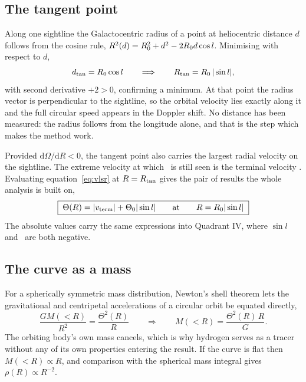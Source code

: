 \documentclass[11pt,a4paper]{article}
\begin{document}
\subsection{The tangent point}
\label{sec:tangent}

Along one sightline the Galactocentric radius of a point at heliocentric
distance $d$ follows from the cosine rule, $R^{2}(d) = R_{0}^{2} + d^{2} -
2R_{0} d\cos l$. Minimising with respect to $d$,
%
\begin{equation}
d_{\mathrm{tan}} = R_{0}\cos l
\qquad\Longrightarrow\qquad
R_{\mathrm{tan}} = R_{0}\,|\sin l| ,
\label{eq:rtan}
\end{equation}
%
with second derivative $+2 > 0$, confirming a minimum. At that point the
radius vector is perpendicular to the sightline, so the orbital velocity
lies exactly along it and the full circular speed appears in the Doppler
shift. No distance has been measured: the radius follows from the longitude
alone, and that is the step which makes the method work.

Provided $\mathrm{d}\Omega/\mathrm{d}R < 0$, the tangent point also carries
the largest radial velocity on the sightline. The extreme velocity at which
\HI\ is still seen is the terminal velocity \vterm. Evaluating
equation~\eqref{eq:vlsr} at $R = R_{\mathrm{tan}}$ gives the pair of results the whole
analysis is built on,
%
\begin{equation}
\boxed{\;\Theta(R) = |v_{\mathrm{term}}| + \Theta_{0}|\sin l|
\qquad\text{at}\qquad
R = R_{0}|\sin l| \;}
\label{eq:master}
\end{equation}
%
The absolute values carry the same expressions into Quadrant IV, where
$\sin l$ and \vterm\ are both negative.

\subsection{The curve as a mass}
\label{sec:mass}

For a spherically symmetric mass distribution, Newton's shell theorem lets
the gravitational and centripetal accelerations of a circular orbit be
equated directly,
%
\begin{equation}
\frac{GM(<R)}{R^{2}} = \frac{\Theta^{2}(R)}{R}
\qquad\Longrightarrow\qquad
M(<R) = \frac{\Theta^{2}(R)\,R}{G} .
\label{eq:mass}
\end{equation}
%
The orbiting body's own mass cancels, which is why hydrogen serves as a
tracer without any of its own properties entering the result. If the curve
is flat then $M(<R) \propto R$, and comparison with the spherical mass
integral gives $\rho(R) \propto R^{-2}$.
\end{document}
